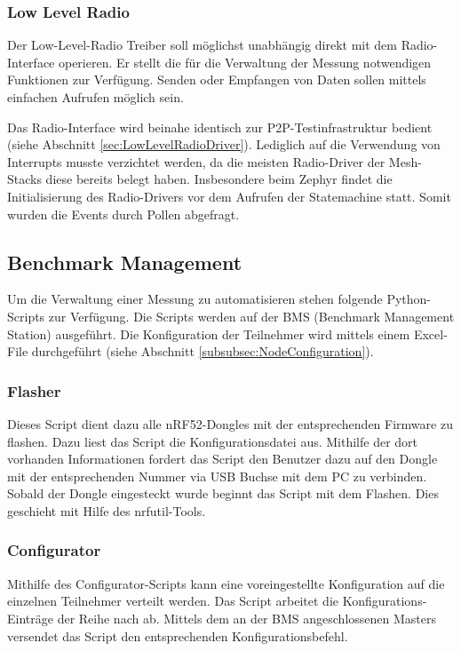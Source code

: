 \subsubsection{Low Level Radio}\label{subsubsec:LowLevelRadio}
Der Low-Level-Radio Treiber soll möglichst unabhängig direkt mit dem Radio-Interface operieren.
Er stellt die für die Verwaltung der Messung notwendigen Funktionen zur Verfügung.
Senden oder Empfangen von Daten sollen mittels einfachen Aufrufen möglich sein.

Das Radio-Interface wird beinahe identisch zur P2P-Testinfrastruktur bedient (siehe Abschnitt \ref{sec:LowLevelRadioDriver}).
Lediglich auf die Verwendung von Interrupts musste verzichtet werden, da die meisten Radio-Driver der Mesh-Stacks diese bereits belegt haben.
Insbesondere beim Zephyr findet die Initialisierung des Radio-Drivers vor dem Aufrufen der Statemachine statt.
Somit wurden die Events durch Pollen abgefragt.


\subsection{Benchmark Management}\label{subsec:Benchmark Management}

Um die Verwaltung einer Messung zu automatisieren stehen folgende Python-Scripts zur Verfügung.
Die Scripts werden auf der BMS (Benchmark Management Station) ausgeführt.
Die Konfiguration der Teilnehmer wird mittels einem Excel-File durchgeführt (siehe Abschnitt \ref{subsubsec:NodeConfiguration}). 


\subsubsection{Flasher}\label{subsubsec:Flash}
Dieses Script dient dazu alle nRF52-Dongles mit der entsprechenden Firmware zu flashen.
Dazu liest das Script die Konfigurationsdatei aus.
Mithilfe der dort vorhanden Informationen fordert das Script den Benutzer dazu auf den Dongle mit der entsprechenden Nummer via USB Buchse mit dem PC zu verbinden.
Sobald der Dongle eingesteckt wurde beginnt das Script mit dem Flashen.
Dies geschieht mit Hilfe des nrfutil-Tools. 

\subsubsection{Configurator}\label{subsubsec:Configurator}
Mithilfe des Configurator-Scripts kann eine voreingestellte Konfiguration auf die einzelnen Teilnehmer verteilt werden.
Das Script arbeitet die Konfigurations-Einträge der Reihe nach ab.
Mittels dem an der BMS angeschlossenen Masters versendet das Script den entsprechenden Konfigurationsbefehl. 

